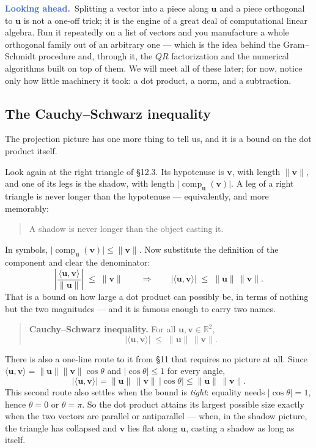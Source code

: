 \documentclass[11pt]{article}
\theoremstyle{definition}
\theoremstyle{remark}
\newcommand{\lookahead}{\par\smallskip\noindent
  \textbf{\sffamily\textcolor{RoyalBlue}{Looking ahead.}}\ \ignorespaces}
\newcommand{\R}{\mathbb{R}}
\newcommand{\vc}[1]{\mathbf{#1}}
\newcommand{\norm}[1]{\lVert #1\rVert}
\newcommand{\comp}[2]{\operatorname{comp}_{#1}(#2)}
\begin{document}
\lookahead Splitting a vector into a piece along $\vc{u}$ and a piece orthogonal
to $\vc{u}$ is not a one-off trick; it is the engine of a great deal of
computational linear algebra. Run it repeatedly on a list of vectors and you
manufacture a whole orthogonal family out of an arbitrary one --- which is the
idea behind the Gram--Schmidt procedure and, through it, the $QR$ factorization
and the numerical algorithms built on top of them. We will meet all of these
later; for now, notice only how little machinery it took: a dot product, a
norm, and a subtraction.

\subsection{The Cauchy--Schwarz inequality}
The projection picture has one more thing to tell us, and it is a bound on the
dot product itself.

Look again at the right triangle of \S12.3. Its hypotenuse is $\vc{v}$, with
length $\norm{\vc{v}}$, and one of its legs is the shadow, with length
$\lvert\comp{\vc{u}}{\vc{v}}\rvert$. A leg of a right triangle is never longer
than the hypotenuse --- equivalently, and more memorably:

\begin{quote}
A shadow is never longer than the object casting it.
\end{quote}

\noindent In symbols, $\lvert\comp{\vc{u}}{\vc{v}}\rvert\le\norm{\vc{v}}$. Now
substitute the definition of the component and clear the denominator:
\[
  \left\lvert\frac{\langle\vc{u},\vc{v}\rangle}{\norm{\vc{u}}}\right\rvert
  \;\le\; \norm{\vc{v}}
  \qquad\Longrightarrow\qquad
  \lvert\langle\vc{u},\vc{v}\rangle\rvert \;\le\; \norm{\vc{u}}\,\norm{\vc{v}} .
\]
That is a bound on how large a dot product can possibly be, in terms of nothing
but the two magnitudes --- and it is famous enough to carry two names.

\begin{quote}
\textbf{Cauchy--Schwarz inequality.} For all $\vc{u},\vc{v}\in\R^{2}$,
\[
  \bigl\lvert\langle\vc{u},\vc{v}\rangle\bigr\rvert
  \;\le\;
  \norm{\vc{u}}\,\norm{\vc{v}} .
\]
\end{quote}

\noindent There is also a one-line route to it from \S11 that requires no
picture at all. Since $\langle\vc{u},\vc{v}\rangle=\norm{\vc{u}}\norm{\vc{v}}\cos\theta$
and $\lvert\cos\theta\rvert\le1$ for every angle,
\[
  \bigl\lvert\langle\vc{u},\vc{v}\rangle\bigr\rvert
  = \norm{\vc{u}}\,\norm{\vc{v}}\,\lvert\cos\theta\rvert
  \le \norm{\vc{u}}\,\norm{\vc{v}} .
\]
This second route also settles when the bound is \emph{tight}: equality needs
$\lvert\cos\theta\rvert=1$, hence $\theta=0$ or $\theta=\pi$. So the dot product
attains its largest possible size exactly when the two vectors are parallel or
antiparallel --- when, in the shadow picture, the triangle has collapsed and
$\vc{v}$ lies flat along $\vc{u}$, casting a shadow as long as itself.
\end{document}
